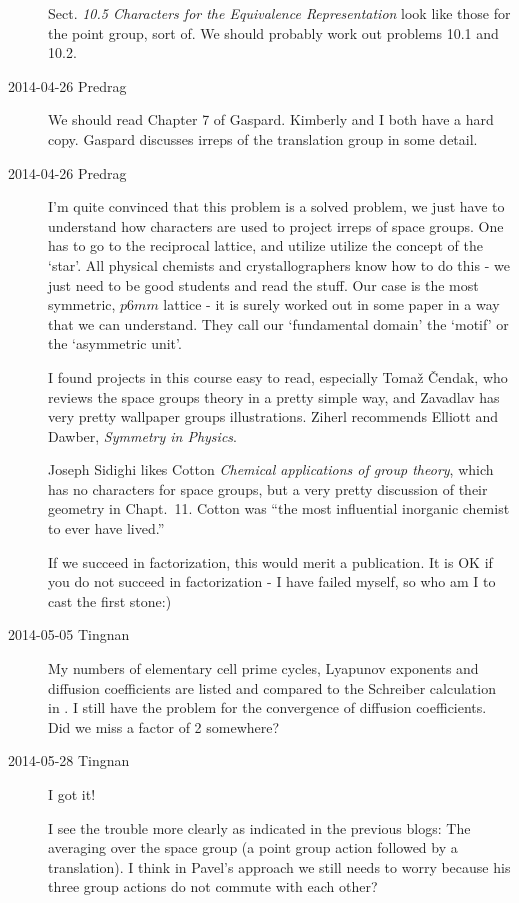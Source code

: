 \begin{description}
Sect. {\em 10.5 Characters for the Equivalence Representation} look
like those for the point group, sort of. We should probably work
out problems 10.1 and 10.2.

\item[2014-04-26 Predrag] We should read Chapter 7 of Gaspard.
Kimberly and I both have a hard copy. Gaspard discusses irreps of
the translation group in some detail.

\item[2014-04-26 Predrag]
I'm quite convinced that this problem is a solved problem, we just have
to understand how characters are used to project irreps of space groups.
One has to go to the reciprocal lattice, and utilize utilize the concept
of the `star'. All physical chemists and crystallographers know how to do
this - we just need to be good students and read the stuff. Our case is
the most symmetric, $p6mm$ lattice - it is surely worked out in some
paper in a way that we can understand. They call our `fundamental domain'
the `motif' or the `asymmetric unit'.

I found projects in  {this
course} easy to read, especially Toma\v{z} \v{C}endak, who reviews the
space groups theory in a pretty simple way, and Zavadlav has very pretty
wallpaper groups illustrations. Ziherl recommends Elliott and  Dawber,
{\em Symmetry in Physics}.

Joseph Sidighi likes Cotton {\em Chemical applications of
group theory}, which has no characters for space groups, but a very
pretty discussion of their geometry in Chapt.~11. Cotton was ``the most
influential inorganic chemist to ever have lived.''

If we succeed in factorization, this would merit a publication.
It is OK if you do not succeed in factorization - I have failed myself, so
who am I to cast the first stone:)

\item[2014-05-05 Tingnan] My numbers of elementary cell prime cycles,
Lyapunov exponents and diffusion coefficients are listed and compared
to the Schreiber calculation in . I still have the problem
for the convergence of diffusion coefficients. Did we miss a factor of 2
somewhere?

\item[2014-05-28 Tingnan] I got it!

I see the trouble more clearly as indicated in the previous blogs: The
averaging over the space group (a point group action followed by a
translation). I think in Pavel's approach we still needs to worry
because his three group actions do not commute with each other?


\end{description}
